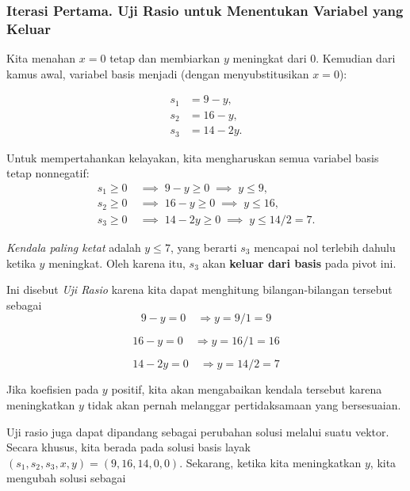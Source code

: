 \subsubsection*{Iterasi Pertama. Uji Rasio untuk Menentukan Variabel yang Keluar}

\begin{tcolorbox}[colback=algleave!6, colframe=algleave, coltitle=white, fonttitle=\bfseries, sharp corners, title={\ding{47}\ Iterasi Pertama: Uji Rasio}]

Kita menahan \(x = 0\) tetap dan membiarkan \(y\) meningkat dari \(0\).  
Kemudian dari kamus awal, variabel basis menjadi (dengan menyubstitusikan \(x = 0\)):

\[
\begin{aligned}
s_1 &= 9 - y, \\
s_2 &= 16 - y, \\
s_3 &= 14 - 2y.
\end{aligned}
\]

Untuk mempertahankan kelayakan, kita mengharuskan semua variabel basis tetap nonnegatif:
\[
\begin{aligned}
s_1 \ge 0 &\;\implies\; 9 - y \ge 0 \;\implies\; y \le 9, \\
s_2 \ge 0 &\;\implies\; 16 - y \ge 0 \;\implies\; y \le 16, \\
s_3 \ge 0 &\;\implies\; 14 - 2y \ge 0 \;\implies\; y \le 14/2 = 7.
\end{aligned}
\]

\emph{Kendala paling ketat} adalah \(y \le 7\), yang berarti \(s_3\) mencapai nol terlebih dahulu ketika \(y\) meningkat.  
Oleh karena itu, \(\boxed{s_3}\) akan \textbf{keluar dari basis} pada pivot ini.

\end{tcolorbox}

Ini disebut \emph{Uji Rasio} karena kita dapat menghitung bilangan-bilangan tersebut sebagai 
$$
9 - y = 0 \quad \Rightarrow y = 9 / 1 = 9
$$

$$
16 - y = 0 \quad \Rightarrow y = 16 / 1 = 16
$$

$$
14 - 2y = 0 \quad \Rightarrow y = 14 / 2 = 7
$$

Jika koefisien pada $y$ positif, kita akan mengabaikan kendala tersebut karena meningkatkan $y$ tidak akan pernah melanggar pertidaksamaan yang bersesuaian.

Uji rasio juga dapat dipandang sebagai perubahan solusi melalui suatu vektor. Secara khusus, kita berada pada solusi basis layak $(s_1, s_2, s_3, x,y) = (9,16,14,0,0)$. Sekarang, ketika kita meningkatkan $y$, kita mengubah solusi sebagai 


